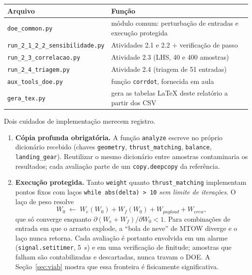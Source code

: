 \documentclass[11pt,a4paper]{article}
\newcommand{\code}[1]{\texttt{\small #1}}
\begin{document}
\begin{center}
\begin{tabular}{ll}
\toprule
Arquivo & Fun\c{c}\~ao \\
\midrule
\code{doe\_common.py}                & m\'odulo comum: perturba\c{c}\~ao de entradas e execu\c{c}\~ao protegida \\
\code{run\_2\_1\_2\_2\_sensibilidade.py} & Atividades 2.1 e 2.2 + verifica\c{c}\~ao de passo \\
\code{run\_2\_3\_correlacao.py}      & Atividade 2.3 (LHS, 40 e 400 amostras) \\
\code{run\_2\_4\_triagem.py}         & Atividade 2.4 (triagem de 51 entradas) \\
\code{aux\_tools\_doe.py}            & fun\c{c}\~ao \code{corrdot}, fornecida em aula \\
\code{gera\_tex.py}                  & gera as tabelas \LaTeX{} deste relat\'orio a partir dos CSV \\
\bottomrule
\end{tabular}
\end{center}

Dois cuidados de implementa\c{c}\~ao merecem registro.

\begin{enumerate}
\item \textbf{C\'opia profunda obrigat\'oria.} A fun\c{c}\~ao \code{analyze}
escreve no pr\'oprio dicion\'ario recebido (chaves \code{geometry},
\code{thrust\_matching}, \code{balance}, \code{landing\_gear}). Reutilizar o
mesmo dicion\'ario entre amostras contaminaria os resultados; cada avalia\c{c}\~ao
parte de um \code{copy.deepcopy} da refer\^encia.

\item \textbf{Execu\c{c}\~ao protegida.} Tanto \code{weight} quanto
\code{thrust\_matching} implementam pontos fixos com la\c{c}os
\code{while abs(delta) > 10} \emph{sem limite de itera\c{c}\~oes}. O la\c{c}o de
peso resolve
\begin{equation}
W_0 \;\longleftarrow\; W_e(W_0) + W_f(W_0) + W_{payload} + W_{crew},
\label{eq:snowball}
\end{equation}
que s\'o converge enquanto $\partial (W_e + W_f)/\partial W_0 < 1$. Para
combina\c{c}\~oes de entrada em que o arrasto explode, a ``bola de neve'' de
MTOW diverge e o la\c{c}o nunca retorna. Cada avalia\c{c}\~ao \'e portanto
envolvida em um alarme (\code{signal.setitimer}, 5~s) e em uma verifica\c{c}\~ao
de finitude; amostras que falham s\~ao contabilizadas e descartadas, nunca
travam o DOE. A Se\c{c}\~ao~\ref{sec:viab} mostra que essa fronteira \'e
fisicamente significativa.
\end{enumerate}
\end{document}
